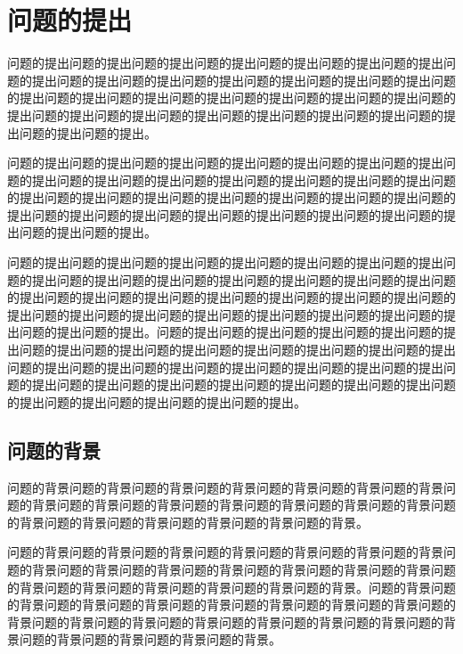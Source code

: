 \documentclass{MMCStyle}
\begin{document}
	\tableofcontents\newpage
    \clearpage
    \pagestyle{fancy}
 
	\section{问题的提出}
问题的\cite{石润2023基于}提出问题的提出问题的提出问题的提出问题的提出问题的提出问题的提出问题的提出问题的提出问题的提出问题的提出问题的提出问题的提出问题的提出问题的提出问题的提出问题的提出问题的提出问题的提\cite{石润2023凤仙花种子包衣载体固定化微生物修复石油烃污染土壤的效应}出问题的提出问题的提出问题的提出问题的提出问题的提出问题的提出问题的提出问题的提出问题的提出问题\cite{李韵诗2015重金属污染土壤植物修复中的微生物功能研究进展}的提出问题\cite{AAAAAA}的提出问题的提出。
 
 问题的提出问题的提出问题的提出问题的提出问题的提出问题的提出问题的提出问题的提出问题的提出问题的提出问题的提出问题的提出问题的提出问题的提出问题的提出问题的提出问题的提出问题的提出问题的提出问题的提出问题的提出问题的提出问题的提出问题的提出问题的提出问题的提出问题的提出问题的提出问题的提出问题的提出问题的提出。
 
 问题的提出问题的提出问题的提出问题的提出问题的提出问题的提出问题的提出问题的提出问题的提出问题的提出问题的提出问题的提出问题的提出问题的提出问题的提出问题的提出问题的提出问题的提出问题的提出问题的提出问题的提出问题的提出问题的提出问题的提出问题的提出问题的提出问题的提出问题的提出问题的提出问题的提出问题的提出。问题的提出问题的提出问题的提出问题的提出问题的提出问题的提出问题的提出问题的提出问题的提出问题的提出问题的提出问题的提出问题的提出问题的提出问题的提出问题的提出问题的提出问题的提出问题的提出问题的提出问题的提出问题的提出问题的提出问题的提出问题的提出问题的提出问题的提出问题的提出问题的提出问题的提出问题的提出。
 
	\subsection{问题的背景}
问题的背景问题的背景问题的背景问题的背景问题的背景问题的背景问题的背景问题的背景问题的背景问题的背景问题的背景问题的背景问题的背景问题的背景问题的背景问题的背景问题的背景问题的背景问题的背景问题的背景。

问题的背景问题的背景问题的背景问题的背景问题的背景问题的背景问题的背景问题的背景问题的背景问题的背景问题的背景问题的背景问题的背景问题的背景问题的背景问题的背景问题的背景问题的背景问题的背景问题的背景。问题的背景问题的背景问题的背景问题的背景问题的背景问题的背景问题的背景问题的背景问题的背景问题的背景问题的背景问题的背景问题的背景问题的背景问题的背景问题的背景问题的背景问题的背景问题的背景问题的背景。
\end{document}
